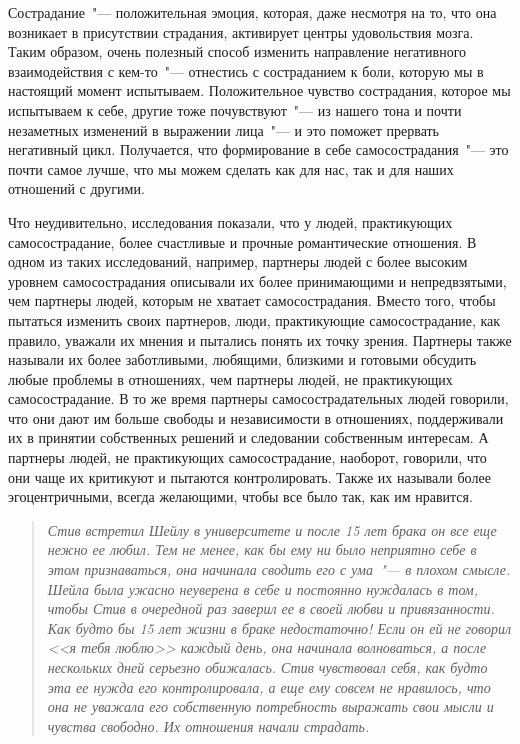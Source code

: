 Сострадание~"--- положительная эмоция, которая, даже несмотря на то, что она возникает в присутствии страдания, активирует центры удовольствия мозга. Таким образом, очень полезный способ изменить направление негативного взаимодействия с кем-то~"--- отнестись с состраданием к боли, которую мы в настоящий момент испытываем. Положительное чувство сострадания, которое мы испытываем к себе, другие тоже почувствуют~"--- из нашего тона и почти незаметных изменений в выражении лица~"--- и это поможет прервать негативный цикл. Получается, что формирование в себе самосострадания~"--- это почти самое лучше, что мы можем сделать как для нас, так и для наших отношений с другими. 

Что неудивительно, исследования показали, что у людей, практикующих самосострадание, более счастливые и прочные романтические отношения. В одном из таких исследований, например, партнеры людей с более высоким уровнем самосострадания описывали их более принимающими и непредвзятыми, чем партнеры людей, которым не хватает самосострадания. Вместо того, чтобы пытаться изменить своих партнеров, люди, практикующие самосострадание, как правило, уважали их мнения и пытались понять их точку зрения. Партнеры также называли их более заботливыми, любящими, близкими и готовыми обсудить любые проблемы в отношениях, чем партнеры людей, не практикующих самосострадание. В то же время партнеры самосострадательных людей говорили, что они дают им больше свободы и независимости в отношениях, поддерживали их в принятии собственных решений и следовании собственным интересам. А партнеры людей, не практикующих самосострадание, наоборот, говорили, что они чаще их критикуют и пытаются контролировать. Также их называли более эгоцентричными, всегда желающими, чтобы все было так, как им нравится. 

\begin{quotation}
	\textit{
		Стив встретил Шейлу в университете и после 15 лет брака он все еще нежно ее любил. Тем не менее, как бы ему ни было неприятно себе в этом признаваться, она начинала сводить его с ума~"--- в плохом смысле. Шейла была ужасно неуверена в себе и постоянно нуждалась в том, чтобы Стив в очередной раз заверил ее в своей любви и привязанности. Как будто бы 15 лет жизни в браке недостаточно! Если он ей не говорил <<я тебя люблю>> каждый день, она начинала волноваться, а после нескольких дней серьезно обижалась. Стив чувствовал себя, как будто эта ее нужда его контролировала, а еще ему совсем не нравилось, что она не уважала его собственную потребность выражать свои мысли и чувства свободно. Их отношения начали страдать.
	}
\end{quotation}

